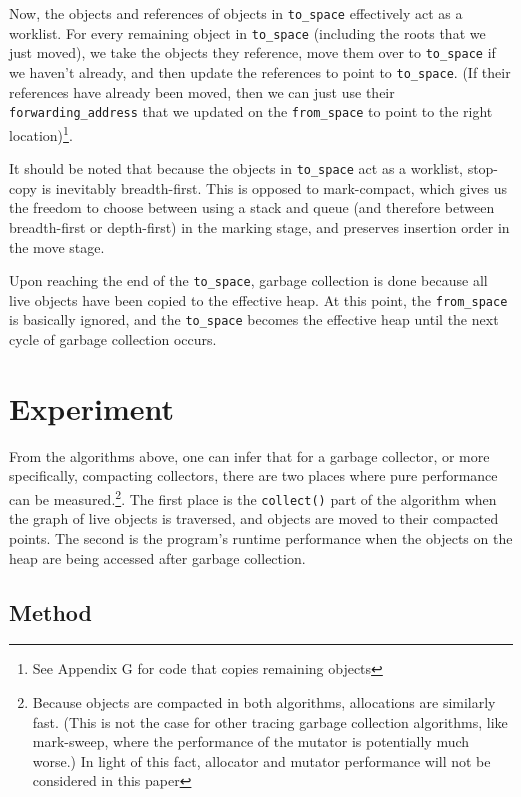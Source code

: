 \documentclass[index]{subfiles}
\begin{document}
Now, the objects and references of objects in \verb+to_space+ effectively act as a worklist. For every remaining object in \verb+to_space+ (including the roots that we just moved), we take the objects they reference, move them over to \verb+to_space+ if we haven't already, and then update the references to point to \verb+to_space+. (If their references have already been moved, then we can just use their \verb+forwarding_address+ that we updated on the \verb+from_space+ to point to the right location)\footnote{See Appendix G for code that copies remaining objects}.

It should be noted that because the objects in \verb+to_space+ act as a worklist, stop-copy is inevitably breadth-first. This is opposed to mark-compact, which gives us the freedom to choose between using a stack and queue (and therefore between breadth-first or depth-first) in the marking stage, and preserves insertion order in the move stage.

Upon reaching the end of the \verb+to_space+, garbage collection is done because all live objects have been copied to the effective heap. At this point, the \verb+from_space+ is basically ignored, and the \verb+to_space+ becomes the effective heap until the next cycle of garbage collection occurs.

\section{Experiment}

From the algorithms above, one can infer that for a garbage collector, or more specifically, compacting collectors, there are two places where pure performance can be measured.\footnote{Because objects are compacted in both algorithms, allocations are similarly fast. (This is not the case for other tracing garbage collection algorithms, like mark-sweep, where the performance of the mutator is potentially much worse.) In light of this fact, allocator and mutator performance will not be considered in this paper}. The first place is the \verb+collect()+ part of the algorithm when the graph of live objects is traversed, and objects are moved to their compacted points. The second is the program's runtime performance when the objects on the heap are being accessed after garbage collection.

\subsection{Method}
\end{document}
